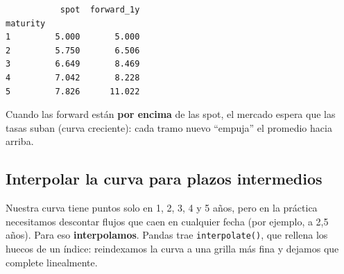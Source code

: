 \documentclass[
  spanish,
  letterpaper,
  DIV=11,
  numbers=noendperiod]{scrreprt}
\begin{document}
\begin{verbatim}
           spot  forward_1y
maturity                   
1         5.000       5.000
2         5.750       6.506
3         6.649       8.469
4         7.042       8.228
5         7.826      11.022
\end{verbatim}

Cuando las forward están \textbf{por encima} de las spot, el mercado
espera que las tasas suban (curva creciente): cada tramo nuevo
``empuja'' el promedio hacia arriba.

\subsection{Interpolar la curva para plazos
intermedios}\label{interpolar-la-curva-para-plazos-intermedios}

Nuestra curva tiene puntos solo en 1, 2, 3, 4 y 5 años, pero en la
práctica necesitamos descontar flujos que caen en cualquier fecha (por
ejemplo, a 2,5 años). Para eso \textbf{interpolamos}. Pandas trae
\texttt{interpolate()}, que rellena los huecos de un índice: reindexamos
la curva a una grilla más fina y dejamos que complete linealmente.
\end{document}

